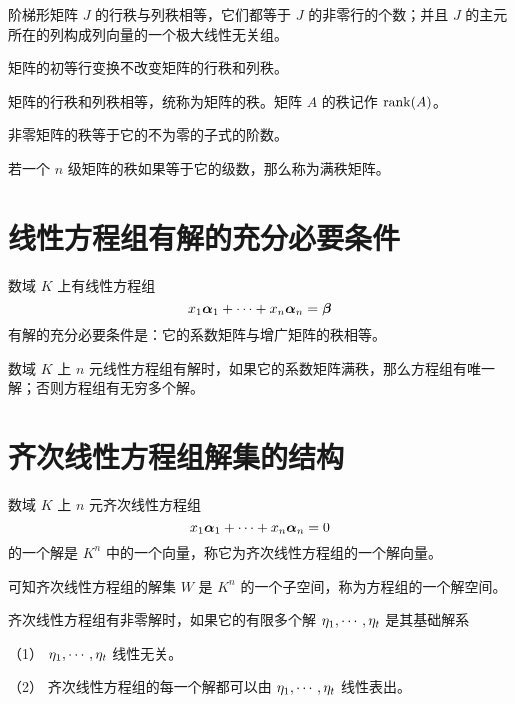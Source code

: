 \begin{theorem}
	阶梯形矩阵 $J$ 的行秩与列秩相等，它们都等于 $J$ 的非零行的个数；并且 $J$ 的主元所在的列构成列向量的一个极大线性无关组。
\end{theorem}

\begin{theorem}
	矩阵的初等行变换不改变矩阵的行秩和列秩。
\end{theorem}

\begin{theorem}
	矩阵的行秩和列秩相等，统称为矩阵的秩。矩阵 $A$ 的秩记作 $\operatorname{rank}(A)$。
\end{theorem}

\begin{theorem}
	非零矩阵的秩等于它的不为零的子式的阶数。
\end{theorem}

若一个 $n$ 级矩阵的秩如果等于它的级数，那么称为满秩矩阵。

\section{线性方程组有解的充分必要条件}

\begin{theorem}
	数域 $K$ 上有线性方程组
	\[x_1\boldsymbol{\alpha}_1 + \cdots + x_n\boldsymbol{\alpha}_n = \boldsymbol{\beta}\]
	有解的充分必要条件是：它的系数矩阵与增广矩阵的秩相等。
\end{theorem}

\begin{theorem}
	数域 $K$ 上 $n$ 元线性方程组有解时，如果它的系数矩阵满秩，那么方程组有唯一解；否则方程组有无穷多个解。
\end{theorem}

\section{齐次线性方程组解集的结构}

数域 $K$ 上 $n$ 元齐次线性方程组
\[x_1\boldsymbol{\alpha}_1 + \cdots + x_n\boldsymbol{\alpha}_n = 0\]
的一个解是 $K^n$ 中的一个向量，称它为齐次线性方程组的一个解向量。

可知齐次线性方程组的解集 $W$ 是 $K^n$ 的一个子空间，称为方程组的一个解空间。

\begin{definition}
	齐次线性方程组有非零解时，如果它的有限多个解 $\eta_1,\cdots,\eta_t$ 是其基础解系

	（1） $\eta_1,\cdots,\eta_t$ 线性无关。

	（2） 齐次线性方程组的每一个解都可以由 $\eta_1,\cdots,\eta_t$ 线性表出。
\end{definition}

